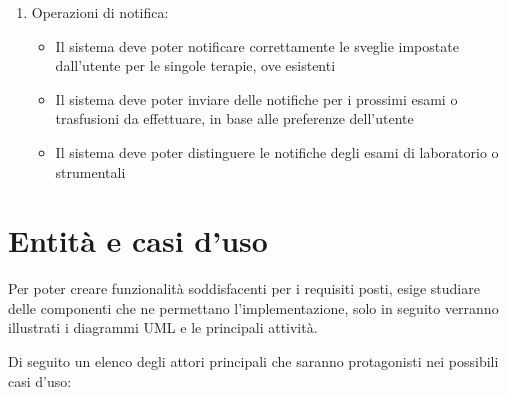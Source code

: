 \documentclass[12pt,a4paper,openright,twoside]{report}
\begin{document}
\begin{enumerate}
\begin{itemize}
\end{itemize}
\item Operazioni di notifica:
\begin{itemize}
\item Il sistema deve poter notificare correttamente le sveglie impostate dall'utente per le singole terapie, ove esistenti
\item Il sistema deve poter inviare delle notifiche per i prossimi esami o trasfusioni da effettuare, in base alle preferenze dell'utente
\item Il sistema deve poter distinguere le notifiche degli esami di laboratorio o strumentali
\end{itemize}
\end{enumerate}

\section{Entità e casi d'uso}
Per poter creare funzionalità soddisfacenti per i requisiti posti, esige studiare delle componenti che ne permettano l'implementazione, solo in seguito verranno illustrati i diagrammi UML e le principali attività.

Di seguito un elenco degli attori principali che saranno protagonisti nei possibili casi d'uso:
\end{document}
